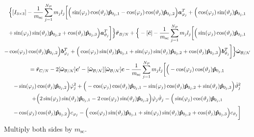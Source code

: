 \documentclass[]{BasiliskReportMemo}
\begin{document}
\begin{multline}
	\Big\{[I_{3\times3}] -\frac{1}{m_{\text{sc}}}\sum_{j=1}^{N_{P}}m_j l_j \bigg[
	\Big(\sin(\varphi_j)\cos(\vartheta_j)\bm{\hat{p}}_{0_j,1}-\cos(\varphi_j)\cos(\vartheta_j)\bm{\hat{p}}_{0_j,2}\Big)\bm a_{\varphi_j}^T +\Big(\cos(\varphi_j)\sin(\vartheta_j)\bm{\hat{p}}_{0_j,1}\\+\sin(\varphi_j)\sin(\vartheta_j)\bm{\hat{p}}_{0_j,2}+\cos(\vartheta_j)\bm{\hat{p}}_{0_j,3}\Big)\bm a_{\vartheta_j}^T \bigg]\Big\}\ddot{\bm r}_{B/N}
	+\Big\{-[\tilde{\bm{c}}] -\frac{1}{m_{\text{sc}}}\sum_{j=1}^{N_{P}}m_j l_j \bigg[
	\Big(\sin(\varphi_j)\cos(\vartheta_j)\bm{\hat{p}}_{0_j,1}\\-\cos(\varphi_j)\cos(\vartheta_j)\bm{\hat{p}}_{0_j,2}\Big)\bm b_{\varphi_j}^T +\Big(\cos(\varphi_j)\sin(\vartheta_j)\bm{\hat{p}}_{0_j,1}+\sin(\varphi_j)\sin(\vartheta_j)\bm{\hat{p}}_{0_j,2}+\cos(\vartheta_j)\bm{\hat{p}}_{0_j,3}\Big)\bm b_{\vartheta_j}^T \bigg] \Big\}\dot{\bm\omega}_{\cal B/N}
	\\= \ddot{\bm r}_{C/N} 	- 2[\tilde{\bm\omega}_{\cal B/N}] \bm c'
	-[\tilde{\bm\omega}_{\cal B/N}][\tilde{\bm\omega}_{\cal B/N}]\bm{c}
	-\frac{1}{m_{\text{sc}}}\sum_{j=1}^{N_{P}}m_j l_j \bigg[ 
	\Big(-\cos(\varphi_j)\cos(\vartheta_j)\bm{\hat{p}}_{0_j,1}\\-\sin(\varphi_j)\cos(\vartheta_j)\bm{\hat{p}}_{0_j,2}\Big)\dot{\varphi}_j^2
	+\Big(-\cos(\varphi_j)\cos(\vartheta_j)\bm{\hat{p}}_{0_j,1}-\sin(\varphi_j)\cos(\vartheta_j)\bm{\hat{p}}_{0_j,2}+\sin(\vartheta_j)\bm{\hat{p}}_{0_j,3} \Big)\dot{\vartheta}_j^2 \\+
	\Big(2\sin(\varphi_j)\sin(\vartheta_j)\bm{\hat{p}}_{0_j,1} -2\cos(\varphi_j)\sin(\vartheta_j)\bm{\hat{p}}_{0_j,2}\Big)\dot{\varphi}_j\dot{\vartheta}_j
	-\Big(\sin(\varphi_j)\cos(\vartheta_j)\bm{\hat{p}}_{0_j,1}\\-\cos(\varphi_j)\cos(\vartheta_j)\bm{\hat{p}}_{0_j,2}\Big)c_{\varphi_j} - \Big(\cos(\varphi_j)\sin(\vartheta_j)\bm{\hat{p}}_{0_j,1}+\sin(\varphi_j)\sin(\vartheta_j)\bm{\hat{p}}_{0_j,2}+\cos(\vartheta_j)\bm{\hat{p}}_{0_j,3}\Big) c_{\vartheta_j} 
	\bigg]
	\label{eq:Rbddot6}
\end{multline}
Multiply both sides by $m_{\text{sc}}$.
	
\end{document}
